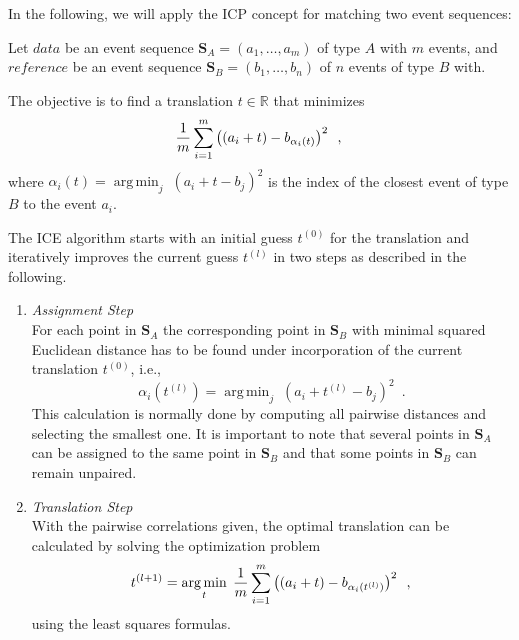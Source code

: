 \documentclass[conference]{IEEEtran}
\theoremstyle{examplestyle}
\DeclareMathOperator*{\argmin}{arg\,min}
\begin{document}
In the following, we will apply the \ac{ICP} concept for matching two event sequences:

Let \(data\) be  an event sequence \(\pmb{S}_A = (a_1,\ldots, a_m)\)   of type \(A\) with \(m\) events,  and \(reference\) be an event sequence \(\pmb{S}_B=(b_1,\ldots, b_n)\)  of \(  n\) events of type \(B\) with.

The objective is to find a translation $t \in \mathbb{R}$ that minimizes 
\begin{equation}
 \dfrac{1}{m} \sum_{i = 1}^{m} \left( (a_i + t) - b_{\alpha_i(t)} \right)^2 \enspace , \\
\end{equation}
where $\alpha_i(t)= \argmin_j \; (a_i+t-b_j)^2$ is the index of the closest event of type  $B$  to the event $a_i$.

The \ac{ICE} algorithm starts with an initial guess $t^{(0)}$ for the translation and iteratively improves the current guess $t^{(l)}$  in two steps as described in the following.

\begin{enumerate}
 \item \emph{Assignment Step}\\
For each point in \(\pmb{S}_A\) the corresponding point in \(\pmb{S}_B\) with minimal squared Euclidean distance has to be found under incorporation of the current translation $t^{(0)}$, i.e., 
\begin{equation}
\alpha_i(t^{(l)})= \argmin_j \;  (a_i+t^{(l)}-b_j)^2  \enspace .
\end{equation}
This calculation is normally done by computing all pairwise distances and selecting the smallest one. It is important to note that several points in \(\pmb{S}_A\) can be assigned to the same point in \(\pmb{S}_B\) and that some points in \(\pmb{S}_B\) can remain unpaired.  



\item  \emph{Translation  Step}\\
With the pairwise correlations given, the optimal translation can be calculated by solving  the optimization problem
\begin{equation}
t^{(l+1)}= \argmin_{t} \;  \dfrac{1}{m} \sum_{i = 1}^{m} \left( (a_i + t) - b_{\alpha_i(t^{(l)})} \right)^2 \enspace , \\
\end{equation}
using the  least squares formulas.
 
\end{enumerate}
\end{document}
